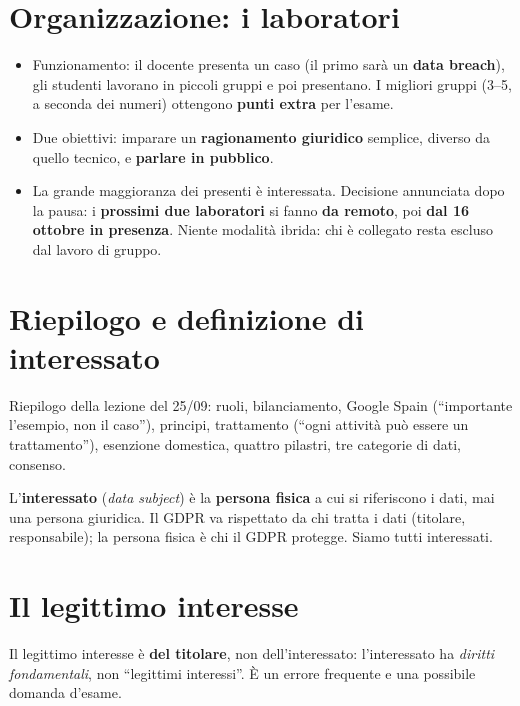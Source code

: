 \section{Organizzazione: i laboratori}
\begin{itemize}
  \item Funzionamento: il docente presenta un caso (il primo sarà un \textbf{data breach}), gli studenti
    lavorano in piccoli gruppi e poi presentano. I migliori gruppi (3--5, a seconda dei numeri)
    ottengono \textbf{punti extra} per l'esame.
  \item Due obiettivi: imparare un \textbf{ragionamento giuridico} semplice, diverso da quello tecnico,
    e \textbf{parlare in pubblico}.
  \item La grande maggioranza dei presenti è interessata. Decisione annunciata dopo la pausa: i
    \textbf{prossimi due laboratori} si fanno \textbf{da remoto}, poi \textbf{dal 16 ottobre in
    presenza}. Niente modalità ibrida: chi è collegato resta escluso dal lavoro di gruppo.
\end{itemize}

\section{Riepilogo e definizione di interessato}
Riepilogo della lezione del 25/09: ruoli, bilanciamento, Google Spain (``importante l'esempio, non il
caso''), principi, trattamento (``ogni attività può essere un trattamento''), esenzione domestica,
quattro pilastri, tre categorie di dati, consenso.

L'\textbf{interessato} (\emph{data subject}) è la \textbf{persona fisica} a cui si riferiscono i dati,
mai una persona giuridica. Il GDPR va rispettato da chi tratta i dati (titolare, responsabile); la
persona fisica è chi il GDPR protegge. Siamo tutti interessati.

\section{Il legittimo interesse}
\begin{esame}
Il legittimo interesse è \textbf{del titolare}, non dell'interessato: l'interessato ha
\emph{diritti fondamentali}, non ``legittimi interessi''. È un errore frequente e una possibile domanda
d'esame.
\end{esame}

